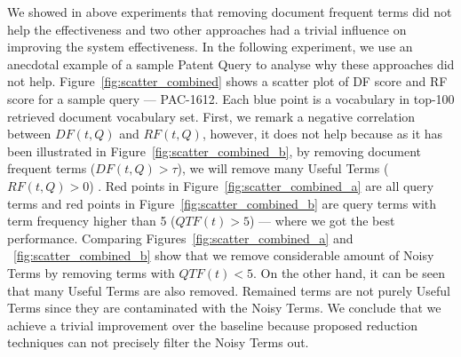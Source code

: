 We showed in above experiments that removing document frequent terms did not help the effectiveness and 
two other approaches had a trivial influence on improving the system effectiveness. 
In the following experiment, we use an anecdotal example of a sample Patent Query to analyse why these approaches did not help. 
Figure~\ref{fig:scatter_combined} shows a scatter plot of DF score and RF score for a sample query --- PAC-1612. Each blue point is a vocabulary in top-100 retrieved document vocabulary set. First, we remark a negative correlation between $\mathit{DF(t, Q)}$ and $\mathit{RF(t, Q)}$, however, it does not help because as it has been illustrated in Figure~\ref{fig:scatter_combined_b}, by removing document frequent terms ($DF(t, Q)>\tau$), we will remove many Useful Terms ($RF(t, Q)>0$) . Red points in Figure~\ref{fig:scatter_combined_a} are all query terms and red points in Figure~\ref{fig:scatter_combined_b} are query terms with term frequency higher than 5 ($QTF(t)>5$) --- where we got the best performance. 
Comparing Figures~\ref{fig:scatter_combined_a} and ~\ref{fig:scatter_combined_b} show that we remove considerable amount of Noisy Terms by removing terms with $QTF(t)<5$. 
On the other hand, it can be seen that many Useful Terms are also removed. Remained terms are not purely Useful Terms since they are contaminated with the Noisy Terms. We conclude that we achieve a trivial improvement over the baseline because proposed reduction techniques can not precisely filter the Noisy Terms out. 
